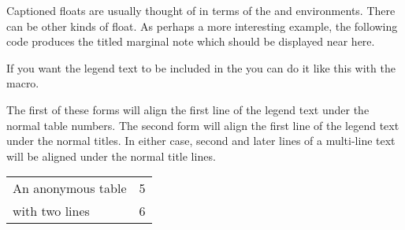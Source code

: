 
  Captioned floats are usually thought of in terms of the 
 and  environments. There can be other kinds of 
float.
As perhaps a more interesting example, the following code produces
the titled marginal note which should be displayed near here.
\begin{lcode}
\end{lcode}


 If you want the legend text to be included 
in the \listofx{}
you can do it like this with the \cmd{\addcontentsline} macro.
\begin{lcode}
\end{lcode}
The first of these forms will align the first line of the legend text
under the normal table numbers. The second form will align 
the first line of the legend text under the normal  titles. 
In either case, second and later lines of a multi-line text will be 
aligned under the normal title lines.

   \begin{shadetable}
   \captiontitlefont{\sffamily}
   \begin{tabular}{lc} \toprule
    An anonymous table & 5 \\
    with two lines     & 6 \\ \bottomrule
   \end{tabular}
   \end{shadetable}

